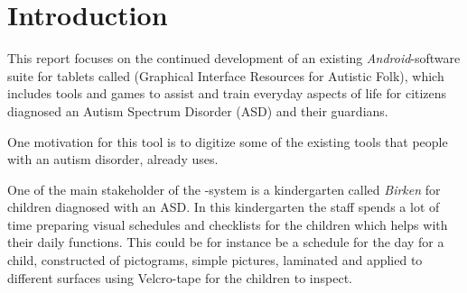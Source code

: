 \chapter{Introduction}
\label{cha:introduction}


This report focuses on the continued development of an existing \emph{Android}-software suite for tablets called \giraf(Graphical Interface Resources for Autistic Folk), which includes tools and games to assist and train everyday aspects of life for citizens diagnosed an Autism Spectrum Disorder (ASD) and their guardians. 

One motivation for this tool is to digitize some of the existing tools that people with an autism disorder, already uses. 

One of the main stakeholder of the \giraf-system is a kindergarten called \emph{Birken} for children diagnosed with an ASD. In this kindergarten the staff spends a lot of time preparing visual schedules and checklists for the children which helps with their daily functions. 
This could be for instance be a schedule for the day for a child, constructed of pictograms, simple pictures, laminated and applied to different surfaces using Velcro-tape for the children to inspect.




